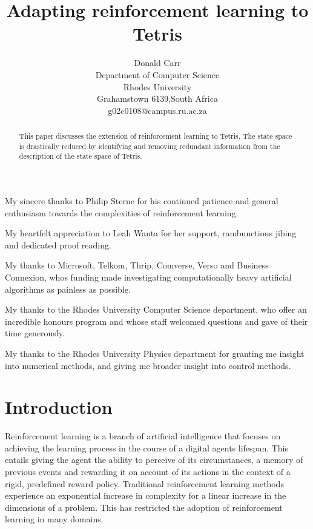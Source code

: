 \documentclass{rucsthesis}
\title{Adapting reinforcement learning to Tetris}
\author{Donald Carr \\ Department of Computer Science \\ Rhodes University \\ Grahamstown 6139,South Africa \\ g02c0108@campus.ru.ac.za}
\begin{document}
\maketitle

\begin{abstract}

This paper discusses the extension of reinforcement learning to Tetris. The state space is drastically reduced by identifying and removing redundant information from the description of the state space of Tetris.

\end{abstract}

\begin{acknowledgements}

My sincere thanks to Philip Sterne for his continued patience and general enthusiasm towards the complexities of reinforcement learning.

My heartfelt appreciation to Leah Wanta for her support, rambunctious jibing and dedicated proof reading. 

My thanks to Microsoft, Telkom, Thrip, Comverse, Verso and Business Connexion, whos funding made investigating computationally heavy artificial algorithms as painless as possible.

My thanks to the Rhodes University Computer Science department, who offer an incredible honours program and whose staff welcomed questions and gave of their time generously.

My thanks to the Rhodes University Physics department for granting me insight into numerical methods, and giving me broader insight into control methods.

\end{acknowledgements}




\tableofcontents
\pagebreak
\listoffigures
\pagebreak
\listoftables
\pagebreak

\chapter{Introduction}

Reinforcement learning is a branch of artificial intelligence that focuses on achieving the learning process in the course of a digital agents lifespan. This entails giving the agent the ability to perceive of its circumstances, a memory of previous events and rewarding it on account of its actions in the context of a rigid, predefined reward policy. Traditional reinforcement learning methods experience an exponential increase in complexity for a linear increase in the dimensions of a problem. This has restricted the adoption of reinforcement learning in many domains.
\end{document}
